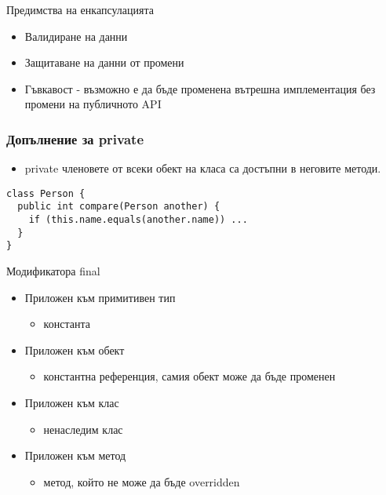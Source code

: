 \documentclass{beamer}
\begin{document}
\begin{frame}{Предимства на енкапсулацията}
  \transdissolve
  \begin{itemize}
  \item Валидиране на данни \pause
  \item Защитаване на данни от промени \pause
  \item Гъвкавост - възможно е да бъде
    променена вътрешна имплементация
    без промени на публичното API
  \end{itemize}
\end{frame}

\begin{frame}[fragile]
  \frametitle{Допълнение за private}
  \transdissolve
  \begin{itemize}
  \item private членовете от всеки обект на
    класа са достъпни в неговите методи.
  \end{itemize}
\begin{lstlisting}
class Person {
  public int compare(Person another) {
    if (this.name.equals(another.name)) ...
  }
}
\end{lstlisting}
\end{frame}

\begin{frame}{Модификатора final}
  \transdissolve
  \begin{itemize}
  \item Приложен към примитивен тип
    \begin{itemize}
      \item константа \pause
    \end{itemize}
  \item Приложен към обект
    \begin{itemize}
    \item константна референция, самия обект
      може да бъде променен \pause
    \end{itemize}
  \item Приложен към клас
    \begin{itemize}
    \item ненаследим клас \pause
    \end{itemize}
  \item Приложен към метод
    \begin{itemize}
    \item метод, който не
      може да бъде overridden
    \end{itemize}

  \end{itemize}
\end{frame}
\end{document}
